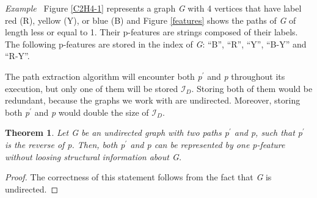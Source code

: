 \documentclass{l4proj}
\newcounter{example}[section]
\newenvironment{example}[1][]{\refstepcounter{example}\par\medskip
   \noindent \textit{Example~\theexample #1} \rmfamily}{\medskip}
\newtheorem{theorem}{Theorem}[section]
\newcommand{\fancyI}{\mathcal{I}}
\begin{document}
\begin{example}
Figure \ref{C2H4-1} represents a graph \emph{G} with 4 vertices that have label red (R), yellow (Y), or blue (B) and Figure \ref{features} shows the paths of \emph{G} of length less or equal to 1. Their p-features are strings composed of their labels. The following p-features are stored in the index of \emph{G}: ``B'', ``R'', ``Y'', ``B-Y'' and ``R-Y''.
\end{example}

The path extraction algorithm will encounter both \emph{p}$^{\prime}$ and \emph{p} throughout its execution, but only one of them will be stored $\fancyI_{D}$. Storing both of them would be redundant, because the graphs we work with are undirected. Moreover, storing both \emph{p}$^{\prime}$ and \emph{p} would double the size of $\fancyI_{D}$.

\begin{theorem}
Let \emph{G} be an undirected graph with two paths \emph{p}$^{\prime}$ and \emph{p}, such that \emph{p}$^{\prime}$ is the reverse of \emph{p}. Then, both \emph{p}$^{\prime}$ and \emph{p} can be represented by one p-feature without loosing structural information about \emph{G}.
\end{theorem}

\begin{proof}
The correctness of this statement follows from the fact that \emph{G} is undirected. 
\end{proof}
\end{document}
